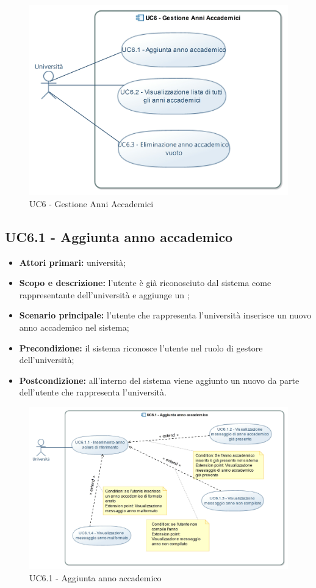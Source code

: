 \documentclass[AnalisiDeiRequisiti.tex]{subfiles}
\begin{document}
\begin{figure}[H]
	\centering
	\includegraphics[width=0.8\linewidth]{UC6.jpg}
	\caption{UC6 - Gestione Anni Accademici}
	\label{fig:UC6 - Gestione Anni Accademici}
\end{figure}

\subsection{UC6.1 - Aggiunta anno accademico}
\begin{itemize}
	\item \textbf{Attori primari:} università;
	\item \textbf{Scopo e descrizione:} l'utente è già riconosciuto dal sistema come rappresentante dell'università e aggiunge un ;
	\item \textbf{Scenario principale:} l'utente che rappresenta l'università inserisce un nuovo anno accademico nel sistema;
	\item \textbf{Precondizione:} il sistema riconosce l'utente nel ruolo di gestore dell'università; 
	\item \textbf{Postcondizione:} all'interno del sistema viene aggiunto un nuovo  da parte dell'utente che rappresenta l'università.
\end{itemize}

\begin{figure}[H]
	\centering
	\includegraphics[width=1.1\linewidth]{UC6_1.jpg}
	\caption{UC6.1 - Aggiunta anno accademico}
	\label{fig:UC6.1 - Aggiunta anno accademico}
\end{figure}
\end{document}
